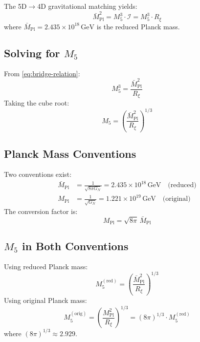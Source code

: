 \documentclass[11pt,a4paper]{article}
\newcommand{\Mpl}{\bar{M}_{\mathrm{Pl}}}
\newcommand{\MplOrig}{M_{\mathrm{Pl}}}
\newcommand{\Mfive}{M_5}
\newcommand{\Rxi}{R_\xi}
\newcommand{\GeV}{\,\mathrm{GeV}}
\theoremstyle{definition}
\theoremstyle{plain}
\theoremstyle{remark}
\begin{document}
The 5D$\to$4D gravitational matching yields:
\begin{equation}
\boxed{\Mpl^2 = \Mfive^3 \cdot \mathcal{I} = \Mfive^3 \cdot \Rxi}
\label{eq:bridge-relation}
\end{equation}
where $\Mpl = 2.435 \times 10^{18}\GeV$ is the reduced Planck mass.

\subsection{Solving for $\Mfive$}

From \cref{eq:bridge-relation}:
\begin{equation}
\Mfive^3 = \frac{\Mpl^2}{\Rxi}
\label{eq:M5-cubed}
\end{equation}
Taking the cube root:
\begin{equation}
\boxed{\Mfive = \left(\frac{\Mpl^2}{\Rxi}\right)^{1/3}}
\label{eq:M5-formula}
\end{equation}

\subsection{Planck Mass Conventions}

Two conventions exist:
\begin{align}
\Mpl &= \frac{1}{\sqrt{8\pi G_N}} = 2.435 \times 10^{18}\GeV \quad \text{(reduced)} \label{eq:Mpl-reduced} \\
\MplOrig &= \frac{1}{\sqrt{G_N}} = 1.221 \times 10^{19}\GeV \quad \text{(original)} \label{eq:Mpl-original}
\end{align}
The conversion factor is:
\begin{equation}
\MplOrig = \sqrt{8\pi} \, \Mpl
\label{eq:planck-conversion}
\end{equation}

\subsection{$\Mfive$ in Both Conventions}

Using reduced Planck mass:
\begin{equation}
\Mfive^{\mathrm{(red)}} = \left(\frac{\Mpl^2}{\Rxi}\right)^{1/3}
\label{eq:M5-reduced}
\end{equation}
Using original Planck mass:
\begin{equation}
\Mfive^{\mathrm{(orig)}} = \left(\frac{\MplOrig^2}{\Rxi}\right)^{1/3} = (8\pi)^{1/3} \cdot \Mfive^{\mathrm{(red)}}
\label{eq:M5-original}
\end{equation}
where $(8\pi)^{1/3} \approx 2.929$.
\end{document}
